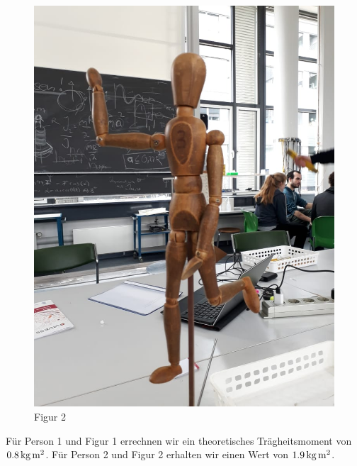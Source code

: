 \begin{figure}
\begin{minipage}{.49\textwidth}
    \includegraphics[scale=.28]{./Bilder/figur2.jpeg}
    \caption{Figur 2}
\end{minipage}
\end{figure}


Für Person 1 und Figur 1 errechnen wir ein theoretisches Trägheitsmoment von  $\unit[0.8]{kg\,m^2}$. Für Person 2 und Figur 2 erhalten wir einen Wert von $\unit[1.9]{kg\,m^2}$. 

